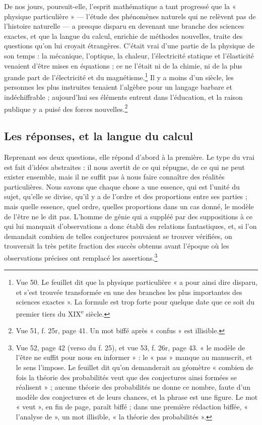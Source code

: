 \documentclass[11pt,a4paper]{article}
\begin{document}
De nos jours, poursuit-elle, l'esprit mathématique a tant progressé que la
« physique particulière » — l'étude des phénomènes naturels qui ne relèvent pas
de l'histoire naturelle — a presque disparu en devenant une branche des
sciences exactes, et que la langue du calcul, enrichie de méthodes nouvelles,
traite des questions qu'on lui croyait étrangères. C'était vrai d'une partie de
la physique de son temps : la mécanique, l'optique, la chaleur, l'électricité
statique et l'élasticité venaient d'être mises en équations ; ce ne l'était ni de
la chimie, ni de la plus grande part de l'électricité et du
magnétisme.\footnote{Vue 50. Le feuillet dit que la physique particulière « a
pour ainsi dire disparu, et s'est trouvée transformée en une des branches les
plus importantes des sciences exactes ». La formule est trop forte pour quelque
date que ce soit du premier tiers du XIX\textsuperscript{e} siècle.} Il y a
moins d'un siècle, les personnes les plus instruites tenaient l'algèbre pour un
langage barbare et indéchiffrable ; aujourd'hui ses éléments entrent dans
l'éducation, et la raison publique y a puisé des forces nouvelles.\footnote{Vue
51, f. 25r, page 41. Un mot biffé après « confus » est illisible.}

\subsection*{Les réponses, et la langue du calcul}

Reprenant ses deux questions, elle répond d'abord à la première. Le type du vrai
est fait d'idées abstraites : il nous avertit de ce qui répugne, de ce qui ne
peut exister ensemble, mais il ne suffit pas à nous faire connaître des réalités
particulières. Nous savons que chaque chose a une essence, qui est l'unité du
sujet, qu'elle se divise, qu'il y a de l'ordre et des proportions entre ses
parties ; mais quelle essence, quel ordre, quelles proportions dans un cas donné,
le modèle de l'être ne le dit pas. L'homme de génie qui a suppléé par des
suppositions à ce qui lui manquait d'observations a donc établi des relations
fantastiques, et, si l'on demandait combien de telles conjectures pouvaient se
trouver vérifiées, on trouverait la très petite fraction des succès obtenus
avant l'époque où les observations précises ont remplacé les
assertions.\footnote{Vue 52, page 42 (verso du f. 25), et vue 53, f. 26r, page
43. « le modèle de l'être ne suffit pour nous en informer » : le « pas » manque
au manuscrit, et le sens l'impose. Le feuillet dit qu'on demanderait au
géomètre « combien de fois la théorie des probabilités veut que des conjectures
ainsi formées se réalisent » ; aucune théorie des probabilités ne donne ce
nombre, faute d'un modèle des conjectures et de leurs chances, et la phrase est
une figure. Le mot « veut », en fin de page, paraît biffé ; dans une
première rédaction biffée, « l'analyse de », un mot illisible, « la théorie
des probabilités ».}
\end{document}
